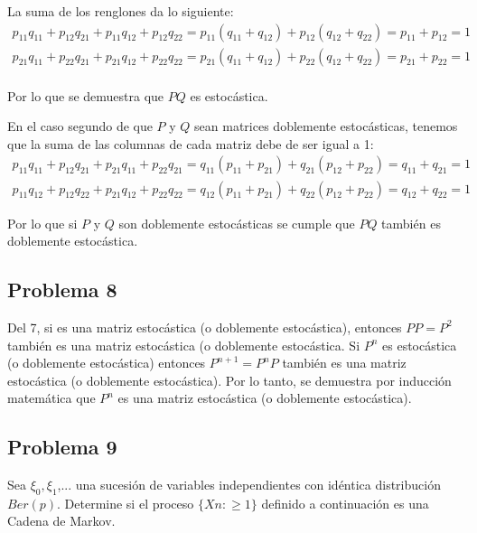 \documentclass{article}
\begin{document}
            La suma de los renglones da lo siguiente:
            \begin{gather*}
                p_{11} q_{11} + p_{12} q_{21} + p_{11} q_{12} + p_{12} q_{22} = p_{11} (q_{11} + q_{12}) + p_{12} (q_{12} + q_{22}) = p_{11} + p_{12} = 1\\
                p_{21} q_{11} + p_{22} q_{21} + p_{21} q_{12} + p_{22} q_{22} = p_{21} (q_{11} + q_{12}) + p_{22} (q_{12} + q_{22}) = p_{21} + p_{22} = 1\\
            \end{gather*}

            Por lo que se demuestra que $PQ$ es estocástica.

            En el caso segundo de que $P$ y $Q$ sean matrices doblemente estocásticas, tenemos que la suma de las columnas de cada matriz debe de ser igual a 1:
            \begin{gather*}
                p_{11} q_{11} + p_{12} q_{21} + p_{21} q_{11} + p_{22} q_{21} = q_{11} (p_{11} + p_{21}) + q_{21} (p_{12} + p_{22}) = q_{11} + q_{21} = 1 \\
                p_{11} q_{12} + p_{12} q_{22} + p_{21} q_{12} + p_{22} q_{22} = q_{12} (p_{11} + p_{21}) + q_{22} (p_{12} + p_{22}) = q_{12} + q_{22} = 1
            \end{gather*}

            Por lo que si $P$ y $Q$ son doblemente estocásticas se cumple que $PQ$ también es doblemente estocástica.

        \subsection*{Problema 8}

            Del 7, si  es una matriz estocástica (o doblemente estocástica), entonces $PP = P^{2}$ también es una matriz estocástica (o doblemente estocástica. Si $P^n$ es estocástica (o doblemente estocástica) entonces $P^{n+1}= P^{n} P$ también es una matriz estocástica (o doblemente estocástica). Por lo tanto, se demuestra por inducción matemática que $P^n$ es una matriz estocástica (o doblemente estocástica).

        \subsection*{Problema 9}

            Sea $\xi_0, \xi_1$,... una sucesión de variables independientes con idéntica distribución $Ber(p)$. Determine si el proceso $\{Xn: \geq 1\}$ definido a continuación es una Cadena de Markov.
\end{document}
